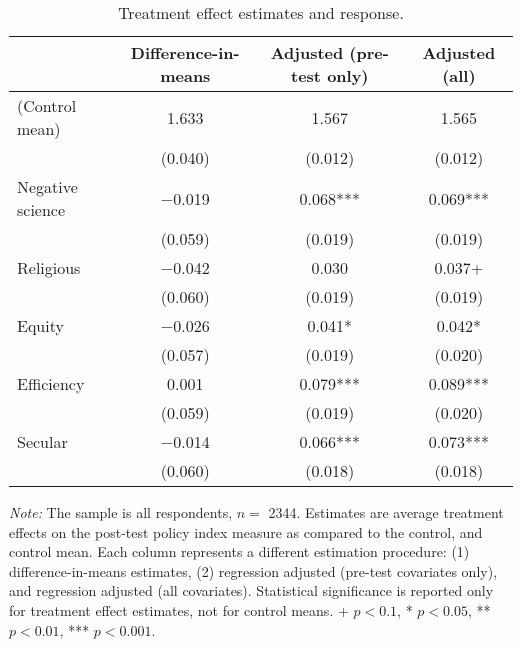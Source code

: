 \begin{table*}

\caption{Treatment effect estimates and response.\label{tab:treatment_effects}}
\centering
\begin{threeparttable}
\begin{tabular}[t]{lccc}
\toprule
  & Difference-in-means & Adjusted (pre-test only) & Adjusted (all)\\
\midrule
(Control mean) & \num{1.633} & \num{1.567} & \num{1.565}\\
 & (\num{0.040}) & (\num{0.012}) & (\num{0.012})\\
Negative science & \num{-0.019} & \num{0.068}*** & \num{0.069}***\\
 & (\num{0.059}) & (\num{0.019}) & (\num{0.019})\\
Religious & \num{-0.042} & \num{0.030} & \num{0.037}+\\
 & (\num{0.060}) & (\num{0.019}) & (\num{0.019})\\
Equity & \num{-0.026} & \num{0.041}* & \num{0.042}*\\
 & (\num{0.057}) & (\num{0.019}) & (\num{0.020})\\
Efficiency & \num{0.001} & \num{0.079}*** & \num{0.089}***\\
 & (\num{0.059}) & (\num{0.019}) & (\num{0.020})\\
Secular & \num{-0.014} & \num{0.066}*** & \num{0.073}***\\
 & (\num{0.060}) & (\num{0.018}) & (\num{0.018})\\
\bottomrule
\end{tabular}
\begin{tablenotes}
\item \footnotesize \textit{Note:} The sample is all respondents, $n = $ \num{2344}. Estimates are average treatment effects on the post-test policy index measure as compared to the control, and control mean. Each column represents a different estimation procedure: (1) difference-in-means estimates, (2) regression adjusted (pre-test covariates only), and regression adjusted (all covariates). Statistical significance is reported only for treatment effect estimates, not for control means. + $p < 0.1$, * $p < 0.05$, ** $p < 0.01$, *** $p < 0.001$.
\end{tablenotes}
\end{threeparttable}
\end{table*}
